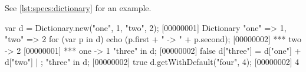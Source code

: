 See \autoref{lst:specs:dictionary} for an example.

\begin{urbiscript}[caption=Dictionaries, label=lst:specs:dictionary]
var d = Dictionary.new("one", 1, "two", 2);
[00000001] Dictionary {"one" => 1, "two" => 2}
for (var p in d)
  echo (p.first + " -> " + p.second);
[00000002] *** two -> 2
[00000001] *** one -> 1
"three" in d;
[00000002] false
d["three"] = d["one"] + d["two"] | {};
"three" in d;
[00000002] true
d.getWithDefault("four", 4);
[00000002] 4
\end{urbiscript}

